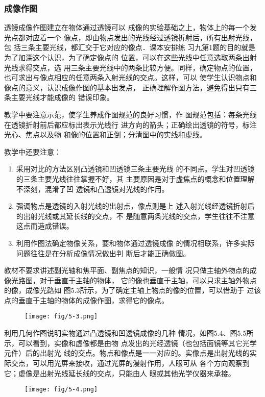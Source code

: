 \subsubsection{成像作图}

透镜成像作图建立在物体通过透镜可以
成像的实验基础之上，物体上的每一个发光点都对应着一个
像点，即由物点发出的光线经过透镜折射后，所有出射光线，包
括三条主要光线，都汇交于它对应的像点．课本安排练
习九第1题的目的就是为了加深这个认识，为了确定像点的
位置，可以在这些光线中任意选取两条出射光线求得交点，选
用三条主要光线中的两条比较方便。同样，确定物点的位置，
也可求出与像点相应的任意两条入射光线的交点。这样，可以
使学生认识物点和像点的意义，认识成像作图的基本出发点，
正确理解作图方法，避免得出只有三条主要光线才能成像的
错误印象。

教学中要注意示范，使学生养成作图规范的良好习惯，作
图规范包括：每条光线在透镜折射前后都应标出表示光线行
进方向的箭头；正确绘出透镜的符号，标注光心、焦点以及物
和像的位置和正倒；分清图中的实线和虚线。

教学中还要注意：
\begin{enumerate}
\item 采用对比的方法区别凸透镜和凹透镜三条主要光线
的不同点。学生对凹透镜的三条主要光线往往掌握不好，其
主要原因是对于虚焦点的概念和位置理解不深刻，混淆了凹
透镜和凸透镜对光线的作用。
\item 强调物点是透镜的入射光线的出射点，像点则是上
述入射光线经透镜折射后的出射光线或其延长线的交点，不
是随意两条光线的交点，学生往往不注意这点而造成错误。
\item 利用作图法确定物像关系，要和物体通过透镜成像
的情况相联系，许多实际问题往往是在分析成像情况做出判
断后才能正确做图。
\end{enumerate}

教材不要求讲述副光轴和焦平面、副焦点的知识，一般情
况只做主轴外物点的成像光路图，对于垂直于主轴的物体，
它的像也垂直于主轴，可以只求主轴外物点的像，成像光路如
图5.3所示，为了确定主轴上物点的像的位置，可以借助于
过该点的垂直于主轴的物体的成像作图，求得它的像点。
\begin{figure}[htp]
    \centering
    \texttt{[image: fig/5-3.png]}
    \caption{}
\end{figure}

利用几何作图说明实物通过凸透镜和凹透镜成像的几种
情况，如图5.4、图5.5所示，可以看到，实像和虚像都是由物
点发出的光经透镜（也包括面镜等其它光学元件）后的出射光
线的交点。物点和像点是一一对应的。实像点是出射光线的实
际交点，可以用光屏来接收，通过光屏的漫射作用，人眼可从
各个方向观察到它；虚像是出射光线延长线的交点，只能由人
眼或其他光学仪器来承接。
\begin{figure}[htp]
    \centering
    \texttt{[image: fig/5-4.png]}
    \caption{}
\end{figure}

